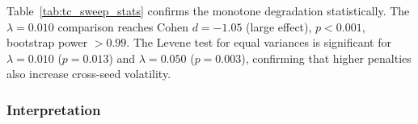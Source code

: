 \documentclass[conference]{IEEEtran}
\begin{document}
\begin{table}[t]
\caption{Statistical Tests: TC Sweep vs.\ $\lambda=0.001$ Baseline ($n=40$ each)}
\label{tab:tc_sweep_stats}
\centering
{}
\end{table}

Table~\ref{tab:tc_sweep_stats} confirms the monotone degradation
statistically. The $\lambda=0.010$ comparison reaches
Cohen $d=-1.05$ (large effect), $p<0.001$, bootstrap power $>0.99$.
The Levene test for equal variances is significant for $\lambda=0.010$
($p=0.013$) and $\lambda=0.050$ ($p=0.003$), confirming that higher
penalties also increase cross-seed volatility.

\subsubsection{Interpretation}
\end{document}

